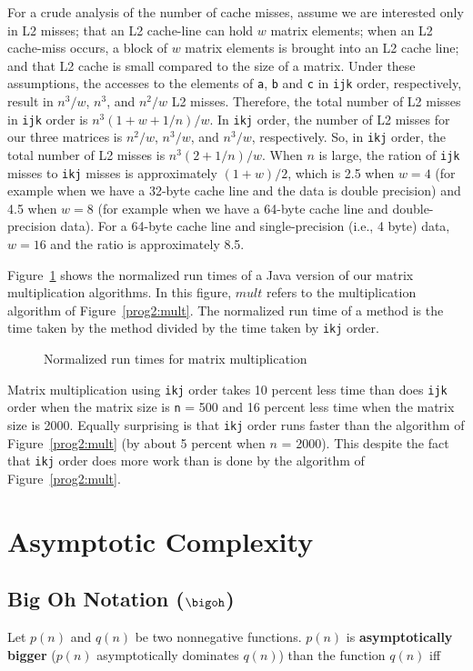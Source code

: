 For a crude analysis of the number of cache misses, assume we are interested
only in L2 misses; that an L2 cache-line can hold $w$ matrix elements;
when an L2 cache-miss occurs, a block of $w$ matrix elements is brought
into an L2 cache line; and that L2 cache is small compared to the
size of a matrix. Under these assumptions, the accesses to the elements
of {\tt a}, {\tt b} and {\tt c} in {\tt ijk} order, respectively, result in
$n^3/w$, $n^3$, and $n^2/w$ L2 misses.
Therefore, the total number of L2 misses in {\tt ijk}
order is $n^3(1+w+1/n)/w$. In {\tt ikj} order, the number of L2 misses
for our three matrices is $n^2/w$, $n^3/w$, and $n^3/w$, respectively.
So, in {\tt ikj} order, the total number of L2 misses is
$n^3(2+1/n)/w$. When $n$ is large, the ration of {\tt ijk} misses to
{\tt ikj} misses is approximately $(1+w)/2$, which is 2.5 when
$w = 4$ (for example when we have a 32-byte cache line and the data is
double precision) and 4.5 when $w = 8$ (for example when we have a 64-byte
cache line and double-precision data). For a 64-byte cache line and
single-precision (i.e., 4 byte) data, $w = 16$ and the ratio is
approximately 8.5.

Figure~\ref{fig2:matrixbar} shows the normalized run times of a Java version
of our matrix multiplication algorithms. In this
figure, $mult$ refers to the multiplication algorithm of
Figure~\ref{prog2:mult}.
The normalized run time of a method
is the time taken by the method divided by the
time taken by {\tt ikj} order.


\begin{figure}
\centerline{\protect{}}
\caption{Normalized run times for matrix multiplication
\label{fig2:matrixbar}}
\end{figure}

Matrix multiplication using
{\tt ikj} order takes 10 percent less time than does {\tt ijk} order
when the matrix size is {\tt n} = 500 and 16 percent less time when
the matrix size is 2000. Equally surprising is that {\tt ikj} order
runs faster than the algorithm of
Figure~\ref{prog2:mult} (by about 5 percent when $n$ = 2000).
This despite the fact that {\tt ikj} order does more work than is done
by the algorithm of Figure~\ref{prog2:mult}.

\section{Asymptotic Complexity}
\subsection{Big Oh Notation ($\bigoh$)}
Let $p(n)$ and $q(n)$ be two nonnegative functions.
$p(n)$ is {\bf asymptotically bigger} ($p(n)$ asymptotically dominates $q(n)$)
than the function $q(n)$ iff


